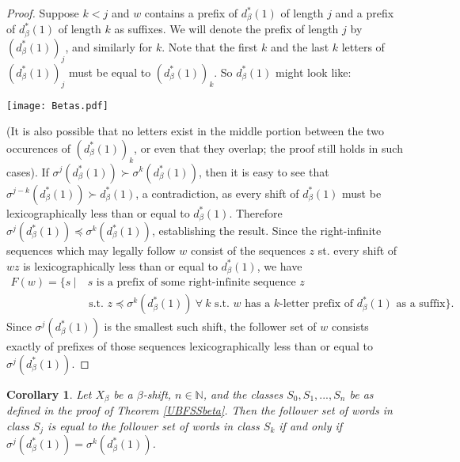 \documentclass{amsart}
\newtheorem{corollary}[theorem]{Corollary}
\theoremstyle{definition}
\numberwithin{equation}{section}
\begin{document}
\begin{proof}
Suppose $k < j$ and $w$ contains a prefix of $d_\beta^* (1)$ of length $j$ and a prefix of $d_\beta^* (1)$ of length $k$ as suffixes. We will denote the prefix of length $j$ by $(d_\beta^* (1))_j$, and similarly for $k$. Note that the first $k$ and the last $k$ letters of $(d_\beta^* (1))_j$ must be equal to $(d_\beta^* (1))_k$. So $d_\beta^* (1)$ might look like:\newline \newline

\texttt{[image: Betas.pdf]} \newline

(It is also possible that no letters exist in the middle portion between the two occurences of $(d_\beta^* (1))_k$, or even that they overlap; the proof still holds in such cases). \newline
If $\sigma^j(d_\beta^* (1)) \succ \sigma^k(d_\beta^* (1))$, then it is easy to see that $\sigma^{j-k}(d_\beta^* (1)) \succ d_\beta^* (1)$, a contradiction, as every shift of $d_\beta^* (1)$ must be lexicographically less than or equal to $d_\beta^* (1)$. Therefore $\sigma^j(d_\beta^* (1)) \preceq \sigma^k(d_\beta^* (1))$, establishing the result. Since the right-infinite sequences which may legally follow $w$ consist of the sequences $z$ st. every shift of $wz$ is lexicographically less than or equal to $d_\beta^* (1)$, we have \newline
$\begin{aligned}
F(w) = \{s \> | & \> s \text{ is a prefix of some right-infinite sequence }z \\
&\text{ s.t. }z \preceq \sigma^k(d_\beta^* (1)) \> \forall \> k \text{ s.t. }w \text{ has a }k \text{-letter prefix of }d_\beta^* (1) \text{ as a suffix}\}.
\end{aligned}$ \newline
Since $\sigma^j(d_\beta^* (1))$ is the smallest such shift, the follower set of $w$ consists exactly of prefixes of those sequences lexicographically less than or equal to $\sigma^j(d_\beta^* (1))$.
\end{proof}

\begin{corollary}\label{betacorrollary} Let $X_\beta$ be a $\beta$-shift, $n \in \mathbb{N}$, and the classes $S_0, S_1, ..., S_n$ be as defined in the proof of Theorem \ref{UBFSSbeta}. Then the follower set of words in class $S_j$ is equal to the follower set of words in class $S_k$ if and only if $\sigma^j(d_\beta^* (1)) = \sigma^k(d_\beta^* (1))$.
\end{corollary}
\end{document}
